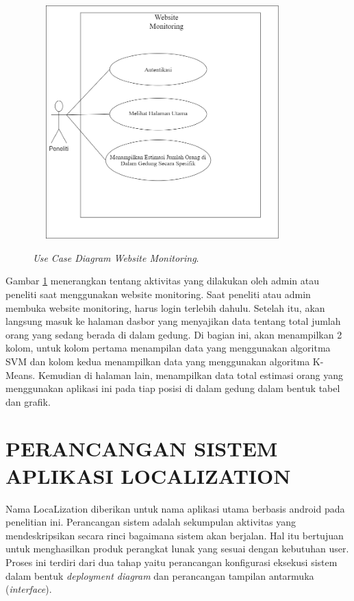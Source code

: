 \begin{figure}[H]
	\center
	\shadowbox
	{\includegraphics [width=10cm, height=9cm]{gambar/model/usecaseWebMonitoring}}
	\caption{\textit{Use Case Diagram Website Monitoring}.}
	\label{usecasewebmonitoring}
\end{figure}

Gambar \ref{usecasewebmonitoring} menerangkan tentang aktivitas yang dilakukan oleh admin atau peneliti saat  menggunakan website monitoring. Saat peneliti atau admin membuka website monitoring, harus login terlebih dahulu. Setelah itu, akan langsung masuk ke halaman dasbor yang menyajikan data tentang total jumlah orang yang sedang berada di dalam gedung. Di bagian ini, akan menampilkan 2 kolom, untuk kolom pertama menampilan data yang menggunakan algoritma SVM dan kolom kedua menampilkan data yang menggunakan algoritma K-Means. Kemudian di halaman lain, menampilkan data total estimasi orang yang menggunakan aplikasi ini pada tiap posisi di dalam gedung dalam bentuk tabel dan grafik.


\section{PERANCANGAN SISTEM APLIKASI LOCALIZATION}


\par Nama LocaLization diberikan untuk nama aplikasi utama berbasis android pada penelitian ini. Perancangan sistem adalah sekumpulan aktivitas yang mendeskripsikan secara rinci bagaimana sistem akan berjalan. Hal itu bertujuan untuk menghasilkan produk perangkat lunak yang sesuai dengan kebutuhan user. Proses ini terdiri dari dua tahap yaitu perancangan konfigurasi eksekusi sistem dalam bentuk \textit{deployment diagram} dan perancangan tampilan antarmuka (\textit{interface}).

